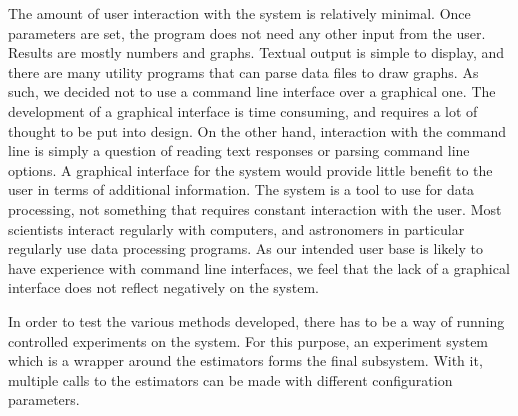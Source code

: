 \documentclass[a4paper,11pt]{article}
\begin{document}
   The amount of user interaction with the system is relatively minimal. Once
   parameters are set, the program does not need any other input from the
   user. Results are mostly numbers and graphs. Textual output is simple to
   display, and there are many utility programs that can parse data files to
   draw graphs. As such, we decided not to use a command line interface over a
   graphical one. The development of a graphical interface is time consuming,
   and requires a lot of thought to be put into design. On the other hand,
   interaction with the command line is simply a question of reading text
   responses or parsing command line options. A graphical interface for the
   system would provide little benefit to the user in terms of additional
   information. The system is a tool to use for data processing, not something
   that requires constant interaction with the user. Most scientists interact
   regularly with computers, and astronomers in particular regularly use data
   processing programs. As our intended user base is likely to have experience
   with command line interfaces, we feel that the lack of a graphical interface
   does not reflect negatively on the system.

   In order to test the various methods developed, there has to be a way of
   running controlled experiments on the system. For this purpose, an experiment
   system which is a wrapper around the estimators forms the final
   subsystem. With it, multiple calls to the estimators can be made with
   different configuration parameters.
\end{document}
